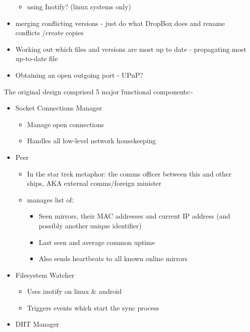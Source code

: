 \documentclass[12pt,a4paper,]{adreport}
\begin{document}
\begin{itemize}
  \begin{itemize}
  \itemsep1pt\parskip0pt
  \item
    using Inotify? (linux systems only)
  \end{itemize}
\item
  merging conflicting versions - just do what DropBox does and rename
  conflicts /create copies
\item
  Working out which files and versions are most up to date - propagating
  most up-to-date file
\item
  Obtaining an open outgoing port - UPnP?
\end{itemize}

The original design comprised 5 major functional components:-

\begin{itemize}
\itemsep1pt\parskip0pt
\item
  Socket Connections Manager

  \begin{itemize}
  \itemsep1pt\parskip0pt
  \item
    Manage open connections
  \item
    Handles all low-level network housekeeping
  \end{itemize}
\item
  Peer

  \begin{itemize}
  \itemsep1pt\parskip0pt
  \item
    In the star trek metaphor: the comms officer between this and other
    ships, AKA external comms/foreign minister
  \item
    manages list of:

    \begin{itemize}
    \itemsep1pt\parskip0pt
    \item
      Seen mirrors, their MAC addresses and current IP address (and
      possibly another unique identifier)
    \item
      Last seen and average common uptime
    \item
      Also sends heartbeats to all known online mirrors
    \end{itemize}
  \end{itemize}
\item
  Filesystem Watcher

  \begin{itemize}
  \itemsep1pt\parskip0pt
  \item
    Uses inotify on linux \& android
  \item
    Triggers events which start the sync process
  \end{itemize}
\item
  DHT Manager


\end{itemize}
\end{document}
